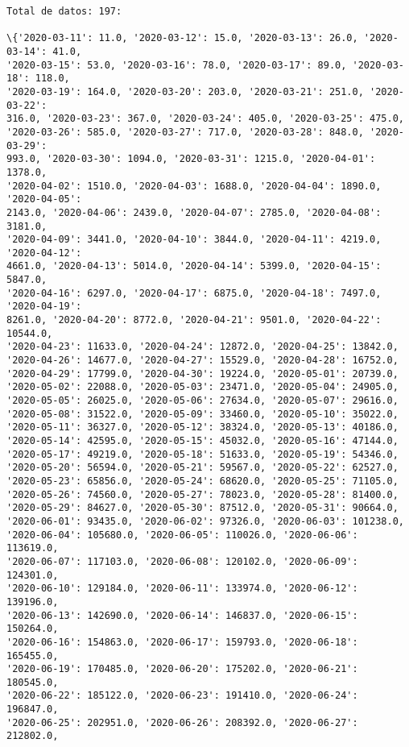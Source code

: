 \documentclass[11pt]{article}
\begin{document}
    \begin{Verbatim}[commandchars=\\\{\}]
Total de datos: 197:

\{'2020-03-11': 11.0, '2020-03-12': 15.0, '2020-03-13': 26.0, '2020-03-14': 41.0,
'2020-03-15': 53.0, '2020-03-16': 78.0, '2020-03-17': 89.0, '2020-03-18': 118.0,
'2020-03-19': 164.0, '2020-03-20': 203.0, '2020-03-21': 251.0, '2020-03-22':
316.0, '2020-03-23': 367.0, '2020-03-24': 405.0, '2020-03-25': 475.0,
'2020-03-26': 585.0, '2020-03-27': 717.0, '2020-03-28': 848.0, '2020-03-29':
993.0, '2020-03-30': 1094.0, '2020-03-31': 1215.0, '2020-04-01': 1378.0,
'2020-04-02': 1510.0, '2020-04-03': 1688.0, '2020-04-04': 1890.0, '2020-04-05':
2143.0, '2020-04-06': 2439.0, '2020-04-07': 2785.0, '2020-04-08': 3181.0,
'2020-04-09': 3441.0, '2020-04-10': 3844.0, '2020-04-11': 4219.0, '2020-04-12':
4661.0, '2020-04-13': 5014.0, '2020-04-14': 5399.0, '2020-04-15': 5847.0,
'2020-04-16': 6297.0, '2020-04-17': 6875.0, '2020-04-18': 7497.0, '2020-04-19':
8261.0, '2020-04-20': 8772.0, '2020-04-21': 9501.0, '2020-04-22': 10544.0,
'2020-04-23': 11633.0, '2020-04-24': 12872.0, '2020-04-25': 13842.0,
'2020-04-26': 14677.0, '2020-04-27': 15529.0, '2020-04-28': 16752.0,
'2020-04-29': 17799.0, '2020-04-30': 19224.0, '2020-05-01': 20739.0,
'2020-05-02': 22088.0, '2020-05-03': 23471.0, '2020-05-04': 24905.0,
'2020-05-05': 26025.0, '2020-05-06': 27634.0, '2020-05-07': 29616.0,
'2020-05-08': 31522.0, '2020-05-09': 33460.0, '2020-05-10': 35022.0,
'2020-05-11': 36327.0, '2020-05-12': 38324.0, '2020-05-13': 40186.0,
'2020-05-14': 42595.0, '2020-05-15': 45032.0, '2020-05-16': 47144.0,
'2020-05-17': 49219.0, '2020-05-18': 51633.0, '2020-05-19': 54346.0,
'2020-05-20': 56594.0, '2020-05-21': 59567.0, '2020-05-22': 62527.0,
'2020-05-23': 65856.0, '2020-05-24': 68620.0, '2020-05-25': 71105.0,
'2020-05-26': 74560.0, '2020-05-27': 78023.0, '2020-05-28': 81400.0,
'2020-05-29': 84627.0, '2020-05-30': 87512.0, '2020-05-31': 90664.0,
'2020-06-01': 93435.0, '2020-06-02': 97326.0, '2020-06-03': 101238.0,
'2020-06-04': 105680.0, '2020-06-05': 110026.0, '2020-06-06': 113619.0,
'2020-06-07': 117103.0, '2020-06-08': 120102.0, '2020-06-09': 124301.0,
'2020-06-10': 129184.0, '2020-06-11': 133974.0, '2020-06-12': 139196.0,
'2020-06-13': 142690.0, '2020-06-14': 146837.0, '2020-06-15': 150264.0,
'2020-06-16': 154863.0, '2020-06-17': 159793.0, '2020-06-18': 165455.0,
'2020-06-19': 170485.0, '2020-06-20': 175202.0, '2020-06-21': 180545.0,
'2020-06-22': 185122.0, '2020-06-23': 191410.0, '2020-06-24': 196847.0,
'2020-06-25': 202951.0, '2020-06-26': 208392.0, '2020-06-27': 212802.0,

\end{Verbatim}
\end{document}
